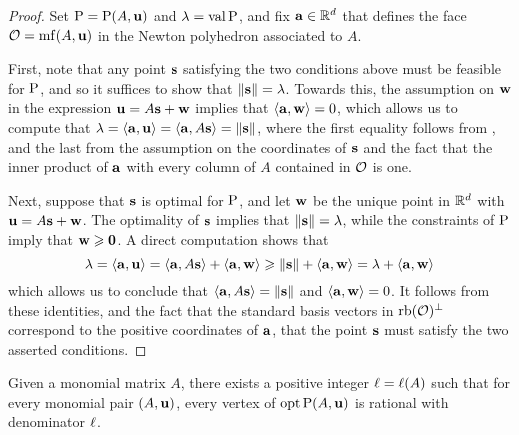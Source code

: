 \documentclass[11pt]{amsart}
\begin{document}
\begin{proof}  
Set $\mathrm{P} = \mathrm{P}(A, \mathbf{u})$ and $\lambda = \operatorname{val} \mathrm{P}$, and fix $\mathbf{a} \in \mathbb{R}^d$ that defines the face $\mathcal{O} = \operatorname{mf}(A, \mathbf{u})$ in the Newton polyhedron associated to $A$. 

First, note that any point $\mathbf{s}$ satisfying the two conditions above must be feasible for $\mathrm{P}$, and so it suffices to show that $\| \mathbf{s} \| = \lambda$.
Towards this, the assumption on $\mathbf{w}$ in the expression $\mathbf{u} = A \mathbf{s} + \mathbf{w}$ implies that $\langle \mathbf{a}, \mathbf{w} \rangle = 0$, which allows us to compute that $\lambda = \langle \mathbf{a}, \mathbf{u} \rangle = \langle \mathbf{a}, A\mathbf{s} \rangle = \| \mathbf{s} \|$, where the first equality follows from 
, and the last from the assumption on the coordinates of $\mathbf{s}$ and the fact that the inner product of $\mathbf{a}$ with every column of $A$ contained in $\mathcal{O}$ is one.

Next, suppose that $\mathbf{s}$ is optimal for $\mathrm{P}$, and let $\mathbf{w}$ be the unique point in $\mathbb{R}^d$ with $\mathbf{u} = A \mathbf{s} + \mathbf{w}$.  The optimality of $\mathbf{s}$ implies that $\| \mathbf{s} \| = \lambda$, while the constraints of $\mathrm{P}$ imply that $\mathbf{w} \geqslant \mathbf{0}$.  A direct computation shows that
%
\[ \lambda = \langle \mathbf{a}, \mathbf{u} \rangle = \langle \mathbf{a}, A \mathbf{s} \rangle + \langle \mathbf{a}, \mathbf{w} \rangle \geqslant \| \mathbf{s} \| + \langle \mathbf{a}, \mathbf{w} \rangle = \lambda + \langle \mathbf{a}, \mathbf{w} \rangle \]
%
which allows us to conclude that $\langle \mathbf{a}, A \mathbf{s} \rangle = \| \mathbf{s} \|$ and $\langle \mathbf{a}, \mathbf{w} \rangle = 0$.
It follows from these identities, and the fact that the standard basis vectors in $\operatorname{rb}(\mathcal{O})^{\perp}$ correspond to the positive coordinates of $\mathbf{a}$, that the point $\mathbf{s}$ must satisfy the two asserted conditions.
\end{proof}



\begin{theorem}  
\label{uniform denominators for vertices:  T}
Given a monomial matrix $A$, there exists a positive integer $\ell = \ell(A)$ such that for every monomial pair $(A, \mathbf{u})$, every vertex of $\operatorname{opt} \mathrm{P}(A, \mathbf{u})$ is rational with denominator $\ell$.
\end{theorem}
\end{document}
